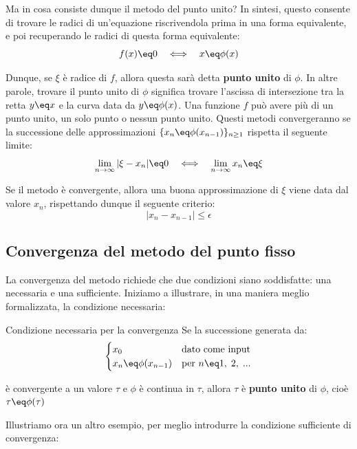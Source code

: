 Ma in cosa consiste dunque il metodo del punto unito? In sintesi, questo consente di trovare le radici di un'equazione riscrivendola prima in una forma equivalente, e poi recuperando le radici di questa forma equivalente:
\[ f(x) \eq 0 \quad \Longleftrightarrow \quad x \eq \phi(x) \]

Dunque, se $\xi$ è radice di $f$, allora questa sarà detta \textbf{punto unito} di $\phi$. In altre parole, trovare il punto unito di $\phi$ significa trovare l'ascissa di intersezione tra la retta $y \eq x$ e la curva data da $y \eq \phi(x)$. Una funzione $f$ può avere più di un punto unito, un solo punto o nessun punto unito.
\nwl
Questi metodi convergeranno se la successione delle approssimazioni $\{ x_n \eq \phi(x_{n - 1})\}_{n \geq 1}$ rispetta il seguente limite:
\[ \lim_{n \to \infty} |\xi - x_n| \eq 0 \quad \Longleftrightarrow \quad \lim_{n \to \infty} x_n \eq \xi \]

Se il metodo è convergente, allora una buona approssimazione di $\xi$ viene data dal valore $x_n$, rispettando dunque il seguente criterio:
\[ |x_n - x_{n - 1}| \leq \epsilon \]

\subsection{Convergenza del metodo del punto fisso}

La convergenza del metodo richiede che due condizioni siano soddisfatte: una necessaria e una sufficiente. Iniziamo a illustrare, in una maniera meglio formalizzata, la condizione necessaria:

\begin{theorem}{Condizione necessaria per la convergenza}
    Se la successione generata da:
    \[ \begin{cases}
        x_0 & \text{dato come input} \\
        x_n \eq \phi(x_{n - 1}) & \text{per } n \eq 1, \; 2, \; ...
    \end{cases} \]

    è convergente a un valore $\tau$ e $\phi$ è continua in $\tau$, allora $\tau$ è \textbf{punto unito} di $\phi$, cioè $\tau \eq \phi(\tau)$
\end{theorem}

Illustriamo ora un altro esempio, per meglio introdurre la condizione sufficiente di convergenza:

